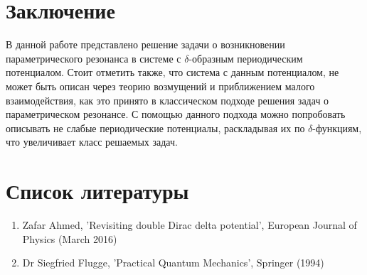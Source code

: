 \documentclass[11pt]{article}    %
\begin{document}
\section{Заключение}
В данной работе представлено решение задачи о возникновении параметрического резонанса в системе с $\delta$-образным периодическим потенциалом.
Стоит отметить также, что система с данным потенциалом, не может быть описан через теорию возмущений и приближением малого взаимодействия, как это принято в классическом подходе решения задач о параметрическом резонансе.
С помощью данного подхода можно попробовать описывать не слабые периодические потенциалы, раскладывая их по $\delta$-функциям, что увеличивает класс решаемых задач.

\section{Список литературы}

   \begin{enumerate}
       \item Zafar Ahmed, 'Revisiting double Dirac delta potential', European Journal of Physics (March 2016)
       \item Dr Siegfried Flugge, 'Practical Quantum Mechanics', Springer (1994)
   \end{enumerate}
\end{document}
